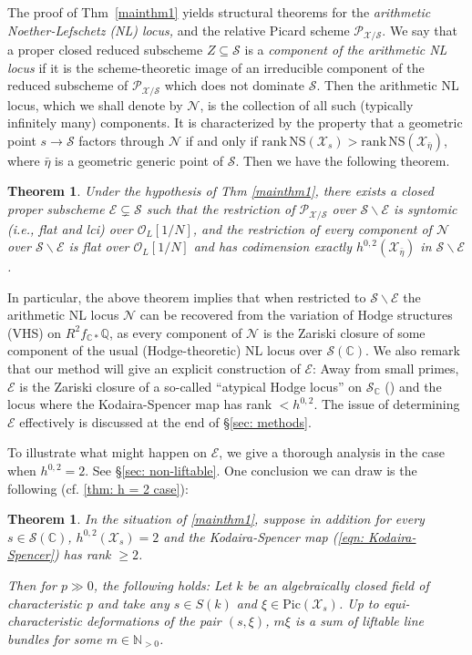 \documentclass[letter, 11pt]{article}
\theoremstyle{plain}
\newtheorem{theorem}[subsubsection]{Theorem}
\theoremstyle{definition}
\newcommand{\IC}{\mathbb{C}}
\newcommand{\IN}{\mathbb{N}}
\newcommand{\IQ}{\mathbb{Q}}
\newcommand{\<}{\langle}
\renewcommand{\>}{\rangle}
\newcommand{\sX}{\mathcal{X}}
\newcommand{\sS}{\mathcal{S}}
\newcommand{\sE}{\mathcal{E}}
\newcommand{\sO}{\mathcal{O}}
\newcommand{\Pic}{\mathrm{Pic}}
\newcommand{\shP}{\mathscr{P}}
\newcommand{\NS}{\mathrm{NS}}
\begin{document}
The proof of Thm~\ref{mainthm1} yields structural theorems for the \textit{arithmetic Noether-Lefschetz (NL) locus,} and the relative Picard scheme $\shP_{\sX/\sS}$. We say that a proper closed reduced subscheme $Z \subseteq \sS$ is a \textit{component of the arithmetic NL locus} if it is the scheme-theoretic image of an irreducible component of the reduced subscheme of $\shP_{\sX/\sS}$ which does not dominate $\sS$. Then the arithmetic NL locus, which we shall denote by $\mathcal{N}$, is the collection of all such (typically infinitely many) components. It is characterized by the property that a geometric point $s \to \sS$ factors through $\mathcal{N}$ if and only if $\mathrm{rank\,} \NS(\sX_{s}) > \mathrm{rank\,} \NS(\sX_{\bar{\eta}})$, where $\bar{\eta}$ is a geometric generic point of $\sS$. Then we have the following theorem. 

\begin{theorem}
\label{mainthm2}
   Under the hypothesis of Thm \ref{mainthm1}, there exists a closed proper subscheme $\sE \subsetneq \sS$ such that the restriction of $\shP_{\sX/\sS}$ over $\sS \smallsetminus \sE$ is syntomic (i.e., flat and lci) over $\sO_L[1/N]$, and the restriction of every component of $\mathcal{N}$ over $\sS \smallsetminus \sE$ is flat over $\sO_L[1/N]$ and has codimension exactly $h^{0, 2}(\sX_{\bar{\eta}})$ in $\sS \smallsetminus \sE$.
 \end{theorem}
In particular, the above theorem implies that when restricted to $\sS \smallsetminus \sE$ the arithmetic NL locus $\mathcal{N}$ can be recovered from the variation of Hodge structures (VHS) on $R^2 f_{\IC *} \IQ$, as every component of $\mathcal{N}$ is the Zariski closure of some component of the usual (Hodge-theoretic) NL locus over $\sS(\IC)$. We also remark that our method will give an explicit construction of $\sE$: Away from small primes, $\sE$ is the Zariski closure of a so-called ``atypical Hodge locus'' on $\sS_\IC$ (\cite{BKU}) and the locus where the Kodaira-Spencer map has rank $< h^{0, 2}$. The issue of determining $\sE$ effectively is discussed at the end of \S\ref{sec: methods}. 

To illustrate what might happen on $\sE$, we give a thorough analysis in the case when $h^{0, 2} = 2$. See \S\ref{sec: non-liftable}. One conclusion we can draw is the following (cf. \ref{thm: h = 2 case}): 

\begin{theorem}
\label{thm: h = 2 case rough}
    In the situation of \ref{mainthm1}, suppose in addition for every $s \in \sS(\IC)$, $h^{0, 2}(\sX_s) = 2$ and the Kodaira-Spencer map (\ref{eqn: Kodaira-Spencer}) has rank $\ge 2$. 

    Then for $p \gg 0$, the following holds: Let $k$ be an algebraically closed field of characteristic $p$ and take any $s \in S(k)$ and $\xi \in \Pic(\sX_s)$. Up to equi-characteristic deformations of the pair $(s, \xi)$, $m\xi$ is a sum of liftable line bundles for some $m \in \IN_{> 0}$. %
\end{theorem}
\end{document}

